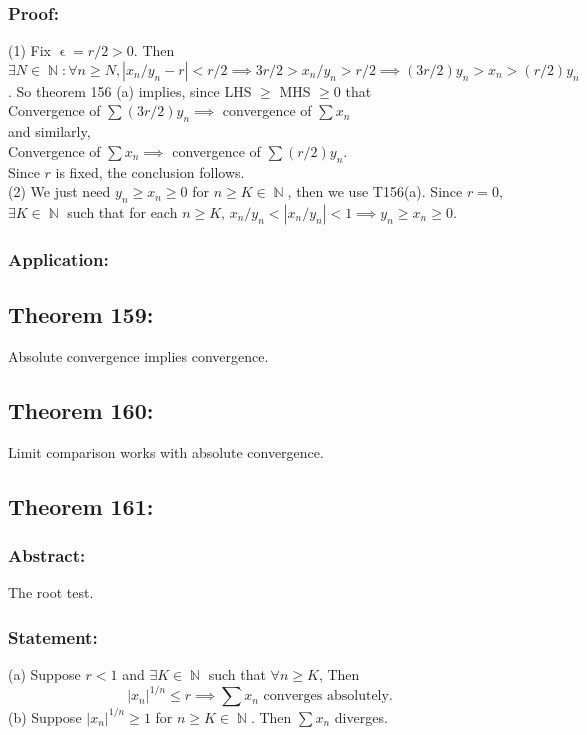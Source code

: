\documentclass{article}
\DeclareMathOperator\eps{\epsilon}
\DeclareMathOperator\N{\mathbb{N}}
\begin{document}
\subsubsection*{Proof:}
(1) Fix $\eps = r \slash 2 >0$.
Then $\exists N \in \N: \forall n \geq N, |x_n \slash y_n - r| < r \slash 2
\implies 3r \slash 2 > x_n \slash y_n > r \slash 2 \implies (3r \slash 2)y_n > x_n > (r \slash 2)y_n$. So
theorem 156 (a) implies, since LHS $\geq$ MHS $\geq 0$ that \\
\newline
Convergence of $\sum (3r \slash 2)y_n \implies $ convergence of $\sum x_n$ \\
\newline
and similarly, \\
\newline
Convergence of $\sum x_n \implies $ convergence of $\sum (r \slash 2)y_n$. \\
\newline
Since $r$ is fixed, the conclusion follows. \\
\newline
(2) We just need $y_n \geq x_n \geq 0$ for $n \geq K \in \N$, then we use T156(a). Since $r=0$,
$\exists K \in \N$ such that for each $n \geq K$,
$x_n \slash y_n<|x_n \slash y_n|<1 \implies y_n \geq x_n \geq 0$.
\subsubsection*{Application:}
\subsection{Theorem 159:}
Absolute convergence implies convergence.
\subsection{Theorem 160:}
Limit comparison works with absolute convergence.
\subsection{Theorem 161:}
\subsubsection*{Abstract:}
The root test.
\subsubsection*{Statement:}
(a) Suppose $r<1$ and $\exists K \in \N$ such that $\forall n \geq K$, Then $$
|x_n|^{1 \slash n} \leq r \implies \sum x_n \text{ converges absolutely.}
$$
(b) Suppose $|x_n|^{1 \slash n} \geq 1$ for $n \geq K \in \N$. Then $\sum x_n$ diverges.
\end{document}
